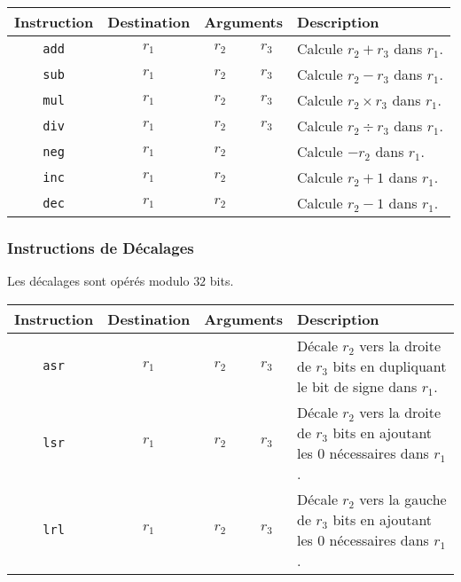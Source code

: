 \documentclass[french, 12pt]{article}
\begin{document}
\noindent
\begin{tabularx}{\textwidth}{cccc X}
      \toprule
      Instruction  & Destination & \multicolumn{2}{c}{Arguments} & Description                                        \\
      \midrule
      \texttt{add} & $r_1$       & $r_2$                         & $r_3$       & Calcule $r_2 + r_3$ dans $r_1$.      \\
      \texttt{sub} & $r_1$       & $r_2$                         & $r_3$       & Calcule $r_2 - r_3$ dans $r_1$.      \\
      \texttt{mul} & $r_1$       & $r_2$                         & $r_3$       & Calcule $r_2 \times r_3$ dans $r_1$. \\
      \texttt{div} & $r_1$       & $r_2$                         & $r_3$       & Calcule $r_2 \div r_3$ dans $r_1$.   \\
      \texttt{neg} & $r_1$       & $r_2$                         &             & Calcule $-r_2$ dans $r_1$.           \\
      \texttt{inc} & $r_1$       & $r_2$                         &             & Calcule $r_2 + 1$ dans $r_1$.        \\
      \texttt{dec} & $r_1$       & $r_2$                         &             & Calcule $r_2 - 1$ dans $r_1$.        \\
      \bottomrule
\end{tabularx}

\subsubsection*{Instructions de Décalages}

Les décalages sont opérés modulo $32$ bits.

\noindent
\begin{tabularx}{\textwidth}{cccc X}
      \toprule
      Instruction  & Destination & \multicolumn{2}{c}{Arguments} & Description                                                                                         \\
      \midrule
      \texttt{asr} & $r_1$       & $r_2$                         & $r_3$       & Décale $r_2$ vers la droite de $r_3$ bits en dupliquant le bit de signe dans $r_1$.   \\
      \texttt{lsr} & $r_1$       & $r_2$                         & $r_3$       & Décale $r_2$ vers la droite de $r_3$ bits en ajoutant les $0$ nécessaires dans $r_1$. \\
      \texttt{lrl} & $r_1$       & $r_2$                         & $r_3$       & Décale $r_2$ vers la gauche de $r_3$ bits en ajoutant les $0$ nécessaires dans $r_1$. \\
      \bottomrule
\end{tabularx}
\end{document}
